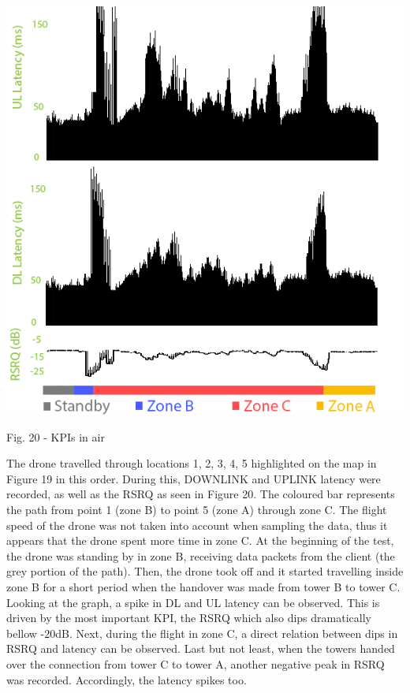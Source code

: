 \documentclass{IEEEtran}
\begin{document}
\begin{center}\includegraphics[scale=.85]{KPIs.png}\end{center}
\begin{it}\begin{center}Fig. 20 - KPIs in air \end{center}\end{it}
The drone travelled through locations 1, 2, 3, 4, 5 highlighted on the map in Figure 19 in this order. During this, DOWNLINK and UPLINK latency were recorded, as well as the RSRQ as seen in Figure 20.
The coloured bar represents the path from point 1 (zone B) to point 5 (zone A) through zone C. The flight speed of the drone was not taken into account when sampling the data, thus it appears that the drone spent more time in zone C.
\newline
\newline 
At the beginning of the test, the drone was standing by in zone B, receiving data packets from the client (the grey portion of the path). Then, the drone took off and it started travelling inside zone B for a short period when the handover was made from tower B to tower C. Looking at the graph, a spike in DL and UL latency can be observed. This is driven by the most important KPI, the RSRQ which also dips dramatically bellow -20dB. Next, during the flight in zone C, a direct relation between dips in RSRQ and latency can be observed. Last but not least, when the towers handed over the connection from tower C to tower A, another negative peak in RSRQ was recorded. Accordingly, the latency spikes too.
\end{document}
